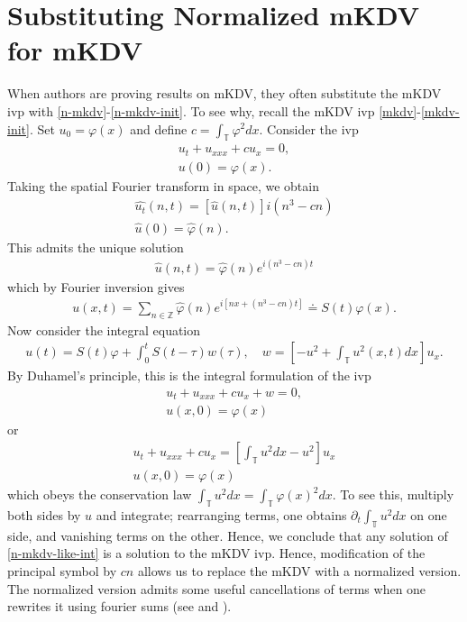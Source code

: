 \documentclass[12pt,reqno]{amsart}
\numberwithin{equation}{section}  %
\newcommand{\zz}{\mathbb{Z}}
\newcommand{\ci}{\mathbb{T}}
\newcommand{\wh}{\widehat}
\newcommand{\p}{\partial}
\newcommand{\vp}{\varphi}
\begin{document}
\section{Substituting Normalized mKDV for mKDV}
  When authors are proving results on mKDV, they often substitute the mKDV ivp
  with \eqref{n-mkdv}-\eqref{n-mkdv-init}. To see why, recall the mKDV ivp
  \eqref{mkdv}-\eqref{mkdv-init}. Set $u_{0} = \vp(x)$ and define $c =
  \int_{\ci} \vp^{2} dx$. Consider the ivp
  \begin{gather*}
    u_{t} + u_{xxx} + c u_{x} = 0,
    \\
    u(0) = \vp(x).
  \end{gather*}
 Taking the spatial Fourier transform in space, we obtain
 \begin{gather*}
   \wh{u_{t}}(n, t) = \left[ \wh{u}(n,t) \right]i\left( n^{3} - cn \right)
   \\
   \wh{u}(0) = \wh{\vp}(n).
 \end{gather*}
 This admits the unique solution
 \begin{equation*}
 \begin{split}
   \wh{u}(n,t) = \wh{\vp}(n) e^{i\left( n^{3} - cn \right)t}
 \end{split}
 \end{equation*}
 which by Fourier inversion gives
 \begin{equation*}
 \begin{split}
   u(x,t) = \sum_{n \in \zz} \wh{\vp}(n) e^{i\left[ nx + \left( n^{3} - cn
   \right)t \right]} \doteq S(t)\vp(x).
 \end{split}
 \end{equation*}
Now consider the integral equation
%
%
\begin{equation}
  \label{n-mkdv-like-int}
\begin{split}
  u(t) = S(t)\vp + \int_{0}^{t} S(t- \tau) w(\tau), \quad w =\left[
  -u^{2} + \int_{\ci} u^{2}(x,t) dx
  \right] u_{x}.
\end{split}
\end{equation}
%
%
By Duhamel's principle, this is the integral formulation of the ivp
\begin{gather*}
  u_{t} + u_{xxx} + c u_{x} + w = 0,
  \\
  u(x,0) = \vp(x)
\end{gather*}
or
\begin{gather*}
  u_{t} + u_{xxx} + c u_{x} = \left[ \int_{\ci} u^{2} dx - u^{2}
  \right]u_{x}
  \\
  u(x,0) = \vp(x)
\end{gather*}
which obeys the conservation law $\int_{\ci}u^{2} dx = \int_{\ci} \vp(x)^{2}
dx$. To see this, multiply both sides by $u$ and integrate; rearranging terms,
one obtains $\p_{t} \int_{\ci} u^{2} dx$ on one side, and vanishing terms on the
other. Hence, we conclude that any solution of \eqref{n-mkdv-like-int} is a
solution to the mKDV ivp. Hence, modification of the principal symbol by $cn$
allows us to replace the mKDV with a normalized version. The normalized version admits
some useful cancellations of terms when one rewrites it using fourier sums (see
\cite{Bourgain-Fourier-transfo} and \cite{Molinet:2011uq}). 
%
%
\end{document}
